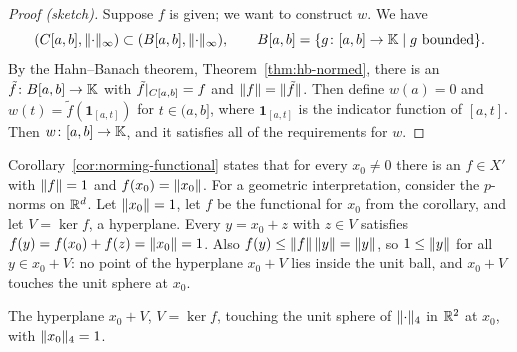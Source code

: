 \begin{proof}[Proof (sketch)]
Suppose $f$ is given; we want to construct $w$. We have
\[
  (C[a,b], \lVert\cdot\rVert_\infty) \subset (B[a,b], \lVert\cdot\rVert_\infty),
  \qquad
  B[a,b] = \{g \colon [a,b] \to \mathbb{K} \mid g \text{ bounded}\} .
\]
By the
Hahn--Banach theorem, Theorem~\ref{thm:hb-normed}, there is an
$\tilde{f} \colon B[a,b] \to \mathbb{K}$ with $\tilde{f}|_{C[a,b]} = f$ and
$\lVert f\rVert = \lVert\tilde{f}\rVert$. Then define $w(a) = 0$ and
$w(t) = \tilde{f}(\mathbf{1}_{[a,t]})$ for $t \in (a,b]$, where
$\mathbf{1}_{[a,t]}$ is the indicator function of $[a,t]$. Then
$w \colon [a,b] \to \mathbb{K}$, and it satisfies all of the requirements for $w$.
\end{proof}

\begin{remark}\label{rem:supporting}
Corollary~\ref{cor:norming-functional} states that for every $x_0 \ne 0$
there is an $f \in X'$ with $\lVert f\rVert = 1$ and $f(x_0) = \lVert x_0\rVert$. For a
geometric interpretation, consider the $p$-norms on $\mathbb{R}^d$. Let
$\lVert x_0\rVert = 1$, let $f$ be the functional for $x_0$ from the corollary,
and let $V = \ker f$, a hyperplane. Every $y = x_0 + z$ with $z \in V$
satisfies $f(y) = f(x_0) + f(z) = \lVert x_0\rVert = 1$. Also
$f(y) \le \lVert f\rVert\,\lVert y\rVert = \lVert y\rVert$, so $1 \le \lVert y\rVert$ for all
$y \in x_0 + V$: no point of the hyperplane $x_0 + V$ lies inside the unit
ball, and $x_0 + V$ touches the unit sphere at $x_0$.
\end{remark}

\begin{nfigure}{The hyperplane $x_0 + V$, $V = \ker f$, touching the unit
sphere of $\lVert\cdot\rVert_4$ in $\mathbb{R}^2$ at $x_0$, with $\lVert x_0\rVert_4 = 1$.}
\end{nfigure}

